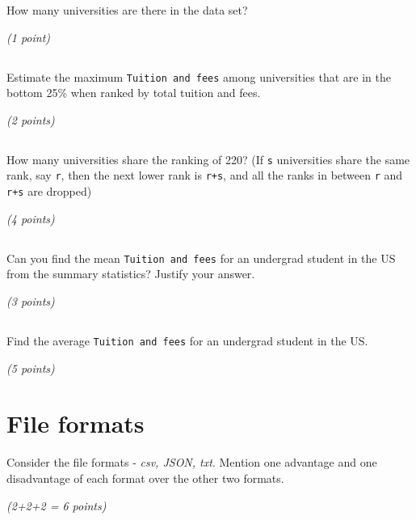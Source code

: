 \documentclass[
  letterpaper,
  DIV=11,
  numbers=noendperiod]{scrreprt}
\begin{document}
How many universities are there in the data set?

\emph{(1 point)}

\hypertarget{section-40}{%
\subsection{}\label{section-40}}

Estimate the maximum \texttt{Tuition\ and\ fees} among universities that
are in the bottom 25\% when ranked by total tuition and fees.

\emph{(2 points)}

\hypertarget{section-41}{%
\subsection{}\label{section-41}}

How many universities share the ranking of 220? (If \texttt{s}
universities share the same rank, say \texttt{r}, then the next lower
rank is \texttt{r+s}, and all the ranks in between \texttt{r} and
\texttt{r+s} are dropped)

\emph{(4 points)}

\hypertarget{section-42}{%
\subsection{}\label{section-42}}

Can you find the mean \texttt{Tuition\ and\ fees} for an undergrad
student in the US from the summary statistics? Justify your answer.

\emph{(3 points)}

\hypertarget{section-43}{%
\subsection{}\label{section-43}}

Find the average \texttt{Tuition\ and\ fees} for an undergrad student in
the US.

\emph{(5 points)}

\hypertarget{file-formats}{%
\section{File formats}\label{file-formats}}

Consider the file formats - \emph{csv, JSON, txt}. Mention one advantage
and one disadvantage of each format over the other two formats.

\emph{(2+2+2 = 6 points)}
\end{document}
